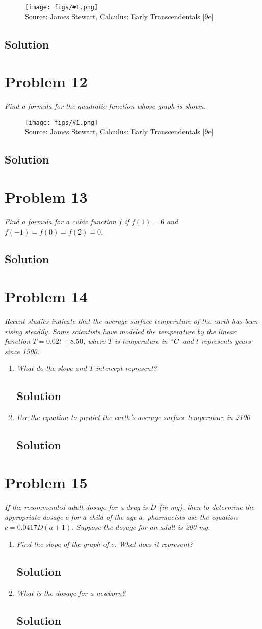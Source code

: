 \documentclass[11pt]{article}
\newcommand{\soln}{\subsection*}
\newcommand{\qn}{\textit}
\newcommand{\imagesource}[1]{{\footnotesize Source: #1}}
\newcommand{\imgqn}[1]{
	\begin{figure}[H]
		\centering
		\texttt{[image: figs/\#1.png]}\\
		\imagesource{James Stewart, Calculus: Early Transcendentals [9e]}
	\end{figure}
}
\begin{document}
\imgqn{1.2.11}

\soln{Solution}

\section*{Problem 12}

\qn{Find a formula for the quadratic function whose graph is shown.}

\imgqn{1.2.12}

\soln{Solution}

\section*{Problem 13}

\qn{Find a formula for a cubic function $f$ if $f(1)=6$ and $f(-1)=f(0)=f(2)=0$.}

\soln{Solution}

\section*{Problem 14}

\qn{Recent studies indicate that the average surface temperature of the earth has been rising steadily. Some scientists have modeled the temperature by the linear function $T=0.02t+8.50$, where $T$ is temperature in $\degree C$ and $t$ represents years since 1900.}

\begin{enumerate}
	\item \qn{What do the slope and $T$-intercept represent?}
	\soln{Solution}
	
	\item \qn{Use the equation to predict the earth's average surface temperature in 2100}
	\soln{Solution}
\end{enumerate}

\section*{Problem 15}

\qn{If the recommended adult dosage for a drug is $D$ (in mg), then to determine the appropriate dosage $c$ for a child of the age $a$, pharmacists use the equation $c=0.0417D(a+1)$. Suppose the dosage for an adult is 200 mg.}

\begin{enumerate}
	\item \qn{Find the slope of the graph of $c$. What does it represent?}
	\soln{Solution}
	
	\item \qn{What is the dosage for a newborn?}
	\soln{Solution}
\end{enumerate}
\end{document}

